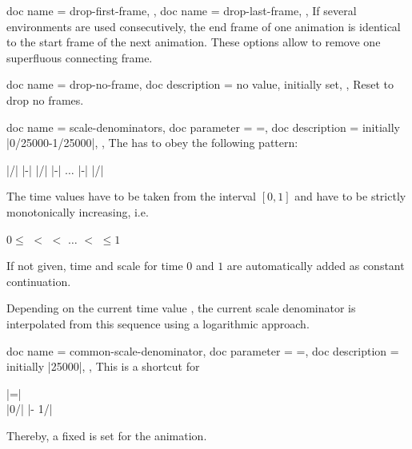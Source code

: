 \begin{docMrcKeys}[
    doc keypath = anim,
    doc new     = 2024-07-31,
    doc parameter   = {\colOpt{=true\textbar false}},
    doc description = {default |true|, initially |false|},
  ]{
    {
      doc name        = drop-first-frame,
    },
    {
      doc name        = drop-last-frame,
    },
  }
  If several  environments are used consecutively,
  the end frame of one animation is identical to the start frame of the
  next animation. These options allow to remove one superfluous connecting frame.
\end{docMrcKeys}


\begin{docMrcKeys}[
    doc keypath = anim,
    doc new     = 2024-07-31,
  ]{
    {
      doc name        = drop-no-frame,
      doc description = {no value, initially set},
    },
  }
  Reset to drop no frames.
\end{docMrcKeys}


\begin{docMrcKeys}[
    doc keypath = anim,
    doc new     = 2024-07-31,
  ]{
    {
      doc name        = scale-denominators,
      doc parameter   = {=},
      doc description = {initially |0/25000-1/25000|},
    },
  }
  The  has to obey the following pattern:
  \par
  |/| |-|
  |/| |-| $\ldots$ |-|
  |/|
  \par
  The time values have to be taken from the interval $[0,1]$ and have to be
  strictly monotonically increasing, i.e.
  \par
  $0\le$  $<$
   $<$ $\ldots$ $<$
   $\le 1$
  \par
  If not given, time and scale for time $0$ and $1$ are automatically added
  as constant continuation.\par
  Depending on the current time value , the current
  scale denominator  is interpolated from this
  sequence using a logarithmic approach.
\end{docMrcKeys}


\begin{docMrcKeys}[
    doc keypath = anim,
    doc new     = 2024-07-31,
  ]{
    {
      doc name        = common-scale-denominator,
      doc parameter   = {=},
      doc description = {initially |25000|},
    },
  }
  This is a shortcut for\par
   |=|\\
  \hspace*{5mm} |0/| |- 1/|
  \par
  Thereby, a fixed  is set for the animation.
\end{docMrcKeys}


